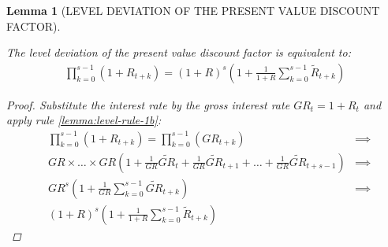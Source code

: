 \documentclass[
	12pt, 
	]{article}
\numberwithin{equation}{section}
\theoremstyle{definition}
\theoremstyle{plain}
\theoremstyle{plain}
\newtheorem{lemma}{Lemma}[section]
\theoremstyle{plain}
\begin{document}

\begin{lemma}[LEVEL DEVIATION OF THE PRESENT VALUE DISCOUNT FACTOR]\label{product-operator}
	
	The level deviation of the present value discount factor is equivalent to:
	\begin{align}
	\label{eq:product-operator}
		\prod_{k=0}^{s-1}(1+R_{t+k}) = (1 + R)^s \left( 1 + \frac{1}{1 + R} \sum_{k=0}^{s-1} \widetilde{R}_{t+k} \right)
	\end{align}
	
	\begin{proof}
		Substitute the interest rate by the gross interest rate $GR_t = 1 + R_t$ and apply rule \ref{lemma:level-rule-1b}:
		\begin{align*}
			& \prod_{k=0}^{s-1}(1+R_{t+k}) = \prod_{k=0}^{s-1}(GR_{t+k})
		&\implies \nonumber \\
			& GR \times \dots \times GR \left( 1 + \frac{1}{GR} \widetilde{GR}_t + \frac{1}{GR} \widetilde{GR}_{t+1} + \dots + \frac{1}{GR} \widetilde{GR}_{t+s-1} \right)
		&\implies \nonumber \\
			& GR^s \left( 1 + \frac{1}{GR} \sum_{k=0}^{s-1} \widetilde{GR}_{t+k} \right)
		&\implies \nonumber \\
			& (1 + R)^s \left( 1 + \frac{1}{1 + R} \sum_{k=0}^{s-1} \widetilde{R}_{t+k} \right) &\,
		\end{align*}
	\end{proof}
	
\end{lemma}


\end{document}
